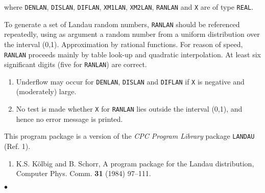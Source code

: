 where {\tt DENLAN}, {\tt DISLAN}, {\tt DIFLAN}, {\tt XM1LAN},
{\tt XM2LAN}, {\tt RANLAN} and {\tt X} are of type {\tt REAL}.
\par
To generate a set of Landau random numbers, {\tt RANLAN} should
be referenced repeatedly, using as argument a random number from a
uniform distribution over the interval (0,1).
\Method
Approximation by rational functions. For reason of speed, {\tt RANLAN}
proceeds mainly by table look-up and quadratic interpolation.
\Accuracy
At least six significant digits (five for {\tt RANLAN}) are correct.
\newpage
\Restrict
\begin{enumerate}
\item Underflow may occur for {\tt DENLAN}, {\tt DISLAN} and
{\tt DIFLAN} if {\tt X} is negative and (moderately) large.
\item No test is made whether {\tt X} for {\tt RANLAN} lies
outside the interval (0,1), and hence no error message is printed.
\end{enumerate}
\Notes
This program package is a version of the
{\it CPC Program Library} package {\tt LANDAU} (Ref. 1).
\Refer
\begin{enumerate}
\item K.S. K\"olbig and B. Schorr, A program package for the Landau
distribution, Computer Phys. Comm. {\bf 31} (1984) 97--111.
\end{enumerate}
$\bullet$

